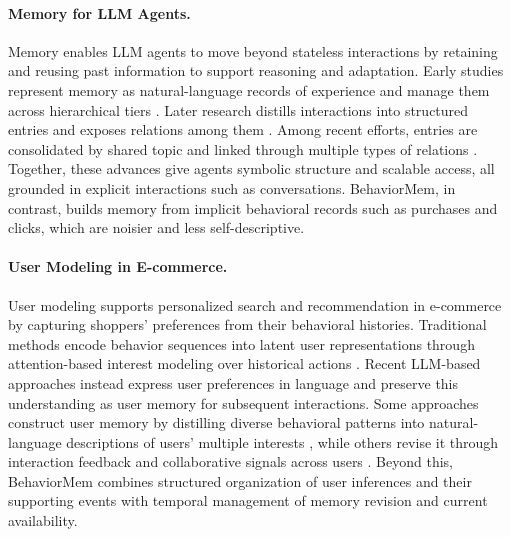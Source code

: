 \documentclass[sigconf,nonacm,balance=false]{acmart}
\begin{document}
\paragraph{\textbf{Memory for LLM Agents.}}
Memory enables LLM agents to move beyond stateless interactions by retaining and reusing past information to support reasoning and adaptation.
Early studies represent memory as natural-language records of experience and manage them across hierarchical tiers \citep{park2023generativeagentsinteractivesimulacra,packer2024memgptllmsoperatingsystems,kang2025memoryos}.
Later research distills interactions into structured entries and exposes relations among them \citep{chhikara2025mem0buildingproductionreadyai,xu2025amemagenticmemoryllm,xia2026memora,hu2026evermemos}.
Among recent efforts, entries are consolidated by shared topic and linked through multiple types of relations \citep{liu2026simplememefficientlifelongmemory,fang2026lightmemlightweightefficientmemoryaugmented,jiang2026magmamultigraphbasedagentic,tan2025reflectivememory,su2026temporalsemanticmemory,sun2026preferenceaware}.
Together, these advances give agents symbolic structure and scalable access, all grounded in explicit interactions such as conversations.
BehaviorMem, in contrast, builds memory from implicit behavioral records such as purchases and clicks, which are noisier and less self-descriptive.

\paragraph{\textbf{User Modeling in E-commerce.}}
User modeling supports personalized search and recommendation in e-commerce by capturing shoppers' preferences from their behavioral histories.
Traditional methods encode behavior sequences into latent user representations through attention-based interest modeling over historical actions \citep{zhou2018deepnetworkclickthroughrate,zhou2018deepevolutionnetworkclickthrough,li2019multiinterestnetworkdynamicrouting,hidasi2016session,kang2018selfattentive,sun2019bert4rec,cen2020controllable,yu2019adaptive,pi2020searchbased,zheng2022disentangling}.
Recent LLM-based approaches instead express user preferences in language and preserve this understanding as user memory for subsequent interactions.
Some approaches construct user memory by distilling diverse behavioral patterns into natural-language descriptions of users' multiple interests \citep{shi2025personaxrecommendationagentoriented,choi2026hierarchicalmultipersonainductionuser,sabouri2025towards,ramos2024transparent,wang2025lettingo,wongso2025genup}, while others revise it through interaction feedback and collaborative signals across users \citep{zhang2023agentcfcollaborativelearningautonomous,chen2026memreccollaborativememoryaugmentedagentic,bang2025llmbased,liao2026atom}.
Beyond this, BehaviorMem combines structured organization of user inferences and their supporting events with temporal management of memory revision and current availability.
\end{document}
